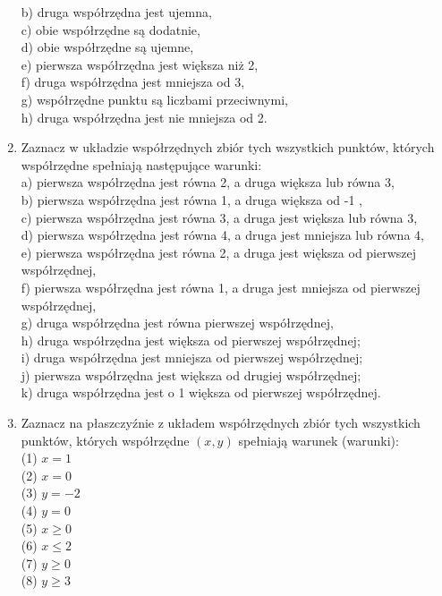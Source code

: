 \documentclass[10pt]{article}
\begin{document}
\begin{enumerate}
b) druga współrzędna jest ujemna,\\
c) obie współrzędne są dodatnie,\\
d) obie współrzędne są ujemne,\\
e) pierwsza współrzędna jest większa niż 2,\\
f) druga współrzędna jest mniejsza od 3,\\
g) współrzędne punktu są liczbami przeciwnymi,\\
h) druga współrzędna jest nie mniejsza od 2.
  \item Zaznacz w układzie współrzędnych zbiór tych wszystkich punktów, których współrzędne spełniają następujące warunki:\\
a) pierwsza współrzędna jest równa 2, a druga większa lub równa 3,\\
b) pierwsza współrzędna jest równa 1, a druga większa od -1 ,\\
c) pierwsza współrzędna jest równa 3, a druga jest większa lub równa 3,\\
d) pierwsza współrzędna jest równa 4, a druga jest mniejsza lub równa 4,\\
e) pierwsza współrzędna jest równa 2, a druga jest większa od pierwszej współrzędnej,\\
f) pierwsza współrzędna jest równa 1, a druga jest mniejsza od pierwszej współrzędnej,\\
g) druga współrzędna jest równa pierwszej współrzędnej,\\
h) druga współrzędna jest większa od pierwszej współrzędnej;\\
i) druga współrzędna jest mniejsza od pierwszej współrzędnej;\\
j) pierwsza współrzędna jest większa od drugiej współrzędnej;\\
k) druga współrzędna jest o 1 większa od pierwszej współrzędnej.
  \item Zaznacz na płaszczyźnie z układem współrzędnych zbiór tych wszystkich punktów, których współrzędne \((x, y)\) spełniają warunek (warunki):\\
(1) \(x=1\)\\
(2) \(x=0\)\\
(3) \(y=-2\)\\
(4) \(y=0\)\\
(5) \(x \geqslant 0\)\\
(6) \(x \leqslant 2\)\\
(7) \(y \geqslant 0\)\\
(8) \(y \geqslant 3\)\\

\end{enumerate}
\end{document}
